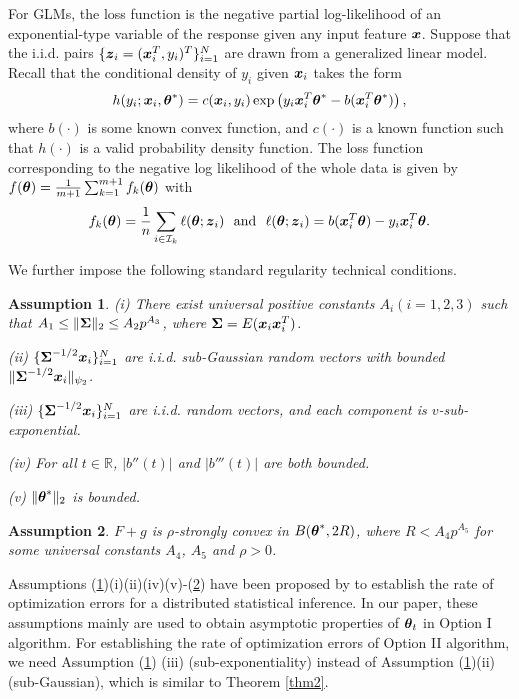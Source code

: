 \documentclass[12pt,a4paper]{article}%
\newtheorem{ass}{Assumption}[section]
\newcommand{\be}{\begin{equation}}
\newcommand{\ee}{\end{equation}}
\newcommand \vc[1]{{\mbox{\boldmath${#1}$}}}
\newcommand \vtheta{\vc \theta}
\newcommand \vZ{\vc z}
\numberwithin{equation}{section}
\newcommand{\sbr}[1]{\left(#1\right)}        %
\begin{document}
For GLMs,  the loss function is the negative partial log-likelihood of an exponential-type variable of the response given any input feature $\vc x$. Suppose that the i.i.d. pairs $\{\vZ_i=(\vc x_i^T, y_i)^T\}_{i=1}^N$ are drawn from a generalized linear model. Recall that the conditional density of $y_i$ given $\vc x_i$ takes the form
$$h(y_i;\vc x_i,\vtheta^*)=c(\vc x_i,y_i)\exp\sbr{y_i\vc x_i^T\vtheta^*-b(\vc x_i^T\vtheta^*)},$$
where $b(\cdot)$ is some known convex function, and $c(\cdot)$ is a known function such that $h(\cdot)$ is a valid probability density function. The loss function corresponding to the negative log likelihood of the whole data is given by
$f(\vtheta)=\frac{1}{m+1}\sum_{k=1}^{m+1}f_k(\vtheta)$ with
\be\label{eq3-7}
f_k(\vtheta)=\frac{1}{n}\sum_{i\in\mathcal{I}_k}\ell(\vtheta;\vZ_i)
~~\mathrm{and}~~\ell(\vtheta;\vZ_i)=b(\vc x_i^T\vtheta)-y_i\vc x_i^T\vtheta.
\ee

We further impose the following standard regularity technical conditions.

\begin{ass}\label{ass-3-6}
(i) There exist universal positive constants $A_i (i=1,2,3)$ such that $A_1\leq \|\vc \Sigma\|_2\leq A_2p^{A_3}$, where $\vc \Sigma=E(\vc x_i\vc x_i^T)$.

(ii) $\{\vc \Sigma^{-1/2}\vc x_i\}_{i=1}^N$ are i.i.d. sub-Gaussian random vectors with bounded $\|\vc \Sigma^{-1/2}\vc x_i\|_{\psi_2}$.

(iii) $\{\vc \Sigma^{-1/2}\vc x_i\}_{i=1}^N$ are i.i.d. random vectors, and each component is $v$-sub-exponential.

(iv) For all $t\in \mathbb{R}$, $|b''(t)|$ and $|b'''(t)|$ are both bounded.

(v) $\|\vtheta^*\|_2$ is bounded.
\end{ass}

\begin{ass}\label{ass-3-7}
$F+g$ is $\rho$-strongly convex in $B(\vtheta^*,2R)$, where $R<A_4p^{A_5}$ for some universal constants $A_4$, $A_5$ and $\rho>0$.
\end{ass}

Assumptions (\ref{ass-3-6})(i)(ii)(iv)(v)-(\ref{ass-3-7}) have been proposed by \cite{FanGuoWang2019} to establish the rate of optimization errors for a distributed statistical inference. In our paper, these assumptions mainly are used to obtain asymptotic properties of $\vtheta_t$ in Option I algorithm. For establishing the rate of optimization errors of Option II algorithm, we need Assumption (\ref{ass-3-6}) {(iii) (sub-exponentiality) instead of Assumption (\ref{ass-3-6})(ii) (sub-Gaussian), which is similar to Theorem \ref{thm2}.}
\end{document}
